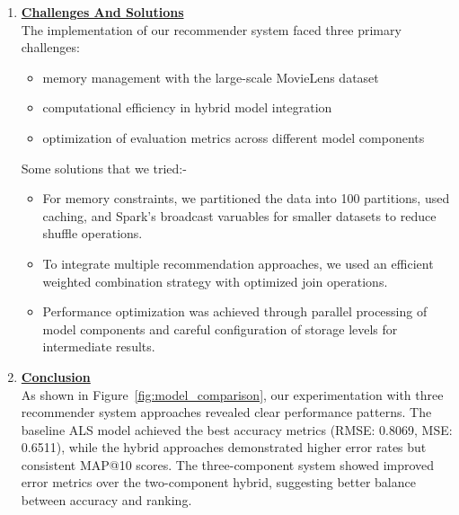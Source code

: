 \documentclass[9pt]{article}
\begin{document}
\begin{enumerate}
\begin{itemize}
\begin{figure}[H]
{        }
      \end{figure}
    \end{itemize}
    \item \textbf{\underline{Challenges And Solutions}}\\
    The implementation of our recommender system faced three primary challenges:
    \begin{itemize}\vspace{-0.5em}
      \item memory management with the large-scale MovieLens dataset
      \item computational efficiency in hybrid model integration
      \item optimization of evaluation metrics across different model components
    \end{itemize}\vspace{-0.5em}
    Some solutions that we tried:-
    \begin{itemize}\vspace{-0.5em}
      \item For memory constraints, we partitioned the data into 100 partitions, used caching, and Spark's broadcast varuables for smaller datasets to reduce shuffle operations.
      \item To integrate multiple recommendation approaches, we used an efficient weighted combination strategy with optimized join operations.
      \item Performance optimization was achieved through parallel processing of model components and careful configuration of storage levels for intermediate results.
    \end{itemize}
  \item \textbf{\underline{Conclusion}}\\
  As shown in Figure~\ref{fig:model_comparison}, our experimentation with three recommender system approaches revealed clear performance patterns. The baseline ALS model achieved the best accuracy metrics (RMSE: 0.8069, MSE: 0.6511), while the hybrid approaches demonstrated higher error rates but consistent MAP@10 scores. The three-component system showed improved error metrics over the two-component hybrid, suggesting better balance between accuracy and ranking.
\end{enumerate}
\end{document}
